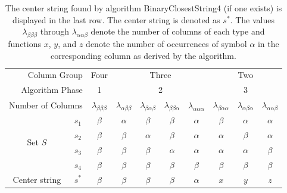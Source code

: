 \begin{table}
\centering
\begin{tabular}{|cc|c|cccc|ccc|}
\hline
\multicolumn{2}{|r|}{Column Group} &
\multicolumn{1}{c|}{Four} &
\multicolumn{4}{c|}{Three} &
\multicolumn{3}{c|}{Two} \\
\multicolumn{2}{|r|}{Algorithm Phase} &
\multicolumn{1}{c|}{1} &
\multicolumn{4}{c|}{2} &
\multicolumn{3}{c|}{3} \\
\hline
\multicolumn{2}{|r|}{Number of Columns} &
$\lambda_{\beta\beta\beta}$ &
$\lambda_{\alpha\beta\beta}$ &
$\lambda_{\beta\alpha\beta}$ &
$\lambda_{\beta\beta\alpha}$ &
$\lambda_{\alpha\alpha\alpha}$ &
$\lambda_{\beta\alpha\alpha}$ &
$\lambda_{\alpha\beta\alpha}$ &
$\lambda_{\alpha\alpha\beta}$ \\
\hline
\multirow{4}{*}{Set $S$} 
& $s_1$ & $\beta$ & $\alpha$ & $\beta$ & $\beta$ &
$\alpha$ & $\beta$ & $\alpha$ & $\alpha$ \\
& $s_2$ & $\beta$ & $\beta$ & $\alpha$ & $\beta$ &
$\alpha$ & $\alpha$ & $\beta$ & $\alpha$ \\
& $s_3$ & $\beta$ & $\beta$ & $\beta$ & $\alpha$ &
$\alpha$ & $\alpha$ & $\alpha$ & $\beta$ \\
& $s_4$ & $\beta$ & $\beta$ & $\beta$ & $\beta$ & 
$\beta$ & $\beta$ & $\beta$ & $\beta$ \\
\hline
Center string & $s^*$ & $\beta$ & $\beta$ & $\beta$ & $\beta$ & $\alpha$ &
$x$ & $y$ & $z$ \\
\hline
\end{tabular}
\caption[Illustration of the center string found by algorithm {\sc BinaryClosestString4}]{The center string found by algorithm {\sc BinaryClosestString4} 
(if one exists) is displayed in the last row. The center string is denoted as $s^*$.
The values $\lambda_{\beta\beta\beta}$ 
through $\lambda_{\alpha\alpha\beta}$ 
denote the number of columns of each type 
and functions $x$, $y$, and $z$ denote the number of occurrences of symbol
$\alpha$ in the corresponding column as derived by the algorithm.}
\label{tab:phase3}
\end{table}

